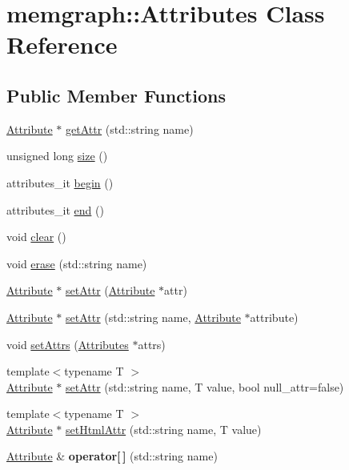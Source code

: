 \hypertarget{classmemgraph_1_1_attributes}{}\section{memgraph\+:\+:Attributes Class Reference}
\label{classmemgraph_1_1_attributes}
\subsection*{Public Member Functions}
\begin{DoxyCompactItemize}
\item 
\hyperlink{classmemgraph_1_1_attribute}{Attribute} $\ast$ \hyperlink{classmemgraph_1_1_attributes_ad4727839c884904e54981934ed5f13a6}{get\+Attr} (std\+::string name)
\item 
unsigned long \hyperlink{classmemgraph_1_1_attributes_a110cb145019c3b6769dd382de7233a1d}{size} ()
\item 
attributes\+\_\+it \hyperlink{classmemgraph_1_1_attributes_a696c45286a5c9a068babcb0a25cf6c45}{begin} ()
\item 
attributes\+\_\+it \hyperlink{classmemgraph_1_1_attributes_a4b11c42cf7f825c2ca1184ca8c84e51e}{end} ()
\item 
void \hyperlink{classmemgraph_1_1_attributes_a8dfedde2ec0511df7790158ecd052da7}{clear} ()
\item 
void \hyperlink{classmemgraph_1_1_attributes_a65256069bfc18ee6f85504a8ad2906bc}{erase} (std\+::string name)
\item 
\hyperlink{classmemgraph_1_1_attribute}{Attribute} $\ast$ \hyperlink{classmemgraph_1_1_attributes_a3dee07fed5fac29de50a4ded809020c4}{set\+Attr} (\hyperlink{classmemgraph_1_1_attribute}{Attribute} $\ast$attr)
\item 
\hyperlink{classmemgraph_1_1_attribute}{Attribute} $\ast$ \hyperlink{classmemgraph_1_1_attributes_a387877e3bb0a66fdcb4255c0c7462b65}{set\+Attr} (std\+::string name, \hyperlink{classmemgraph_1_1_attribute}{Attribute} $\ast$attribute)
\item 
void \hyperlink{classmemgraph_1_1_attributes_ac4b8ac9f1612f9acfb556f3328b131bd}{set\+Attrs} (\hyperlink{classmemgraph_1_1_attributes}{Attributes} $\ast$attrs)
\item 
{\footnotesize template$<$typename T $>$ }\\\hyperlink{classmemgraph_1_1_attribute}{Attribute} $\ast$ \hyperlink{classmemgraph_1_1_attributes_aad6827362c9f9f1c035b91248ce2efdb}{set\+Attr} (std\+::string name, T value, bool null\+\_\+attr=false)
\item 
{\footnotesize template$<$typename T $>$ }\\\hyperlink{classmemgraph_1_1_attribute}{Attribute} $\ast$ \hyperlink{classmemgraph_1_1_attributes_ad56dc8c01cf38ed4bed3483c7cab1da7}{set\+Html\+Attr} (std\+::string name, T value)
\item 
\hyperlink{classmemgraph_1_1_attribute}{Attribute} \& {\bfseries operator\mbox{[}$\,$\mbox{]}} (std\+::string name)\hypertarget{classmemgraph_1_1_attributes_ae69889797aa27a9386b1f3d0ad7c711f}{}\label{classmemgraph_1_1_attributes_ae69889797aa27a9386b1f3d0ad7c711f}


\end{DoxyCompactItemize}

